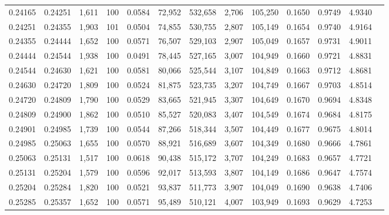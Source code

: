 \begin{tabular}{rrrrrrrrrrrrr}
0.24165 & 0.24251 & 1,611 & 100 &                                     0.0584 &  72,952 & 532,658 &   2,706 & 105,250 & 0.1650 & 0.9749 & 4.9340 \\
0.24251 & 0.24355 & 1,903 & 101 &                                     0.0504 &  74,855 & 530,755 &   2,807 & 105,149 & 0.1654 & 0.9740 & 4.9164 \\
0.24355 & 0.24444 & 1,652 & 100 &                                     0.0571 &  76,507 & 529,103 &   2,907 & 105,049 & 0.1657 & 0.9731 & 4.9011 \\
0.24444 & 0.24544 & 1,938 & 100 &                                     0.0491 &  78,445 & 527,165 &   3,007 & 104,949 & 0.1660 & 0.9721 & 4.8831 \\
0.24544 & 0.24630 & 1,621 & 100 &                                     0.0581 &  80,066 & 525,544 &   3,107 & 104,849 & 0.1663 & 0.9712 & 4.8681 \\
0.24630 & 0.24720 & 1,809 & 100 &                                     0.0524 &  81,875 & 523,735 &   3,207 & 104,749 & 0.1667 & 0.9703 & 4.8514 \\
0.24720 & 0.24809 & 1,790 & 100 &                                     0.0529 &  83,665 & 521,945 &   3,307 & 104,649 & 0.1670 & 0.9694 & 4.8348 \\
0.24809 & 0.24900 & 1,862 & 100 &                                     0.0510 &  85,527 & 520,083 &   3,407 & 104,549 & 0.1674 & 0.9684 & 4.8175 \\
0.24901 & 0.24985 & 1,739 & 100 &                                     0.0544 &  87,266 & 518,344 &   3,507 & 104,449 & 0.1677 & 0.9675 & 4.8014 \\
0.24985 & 0.25063 & 1,655 & 100 &                                     0.0570 &  88,921 & 516,689 &   3,607 & 104,349 & 0.1680 & 0.9666 & 4.7861 \\
0.25063 & 0.25131 & 1,517 & 100 &                                     0.0618 &  90,438 & 515,172 &   3,707 & 104,249 & 0.1683 & 0.9657 & 4.7721 \\
0.25131 & 0.25204 & 1,579 & 100 &                                     0.0596 &  92,017 & 513,593 &   3,807 & 104,149 & 0.1686 & 0.9647 & 4.7574 \\
0.25204 & 0.25284 & 1,820 & 100 &                                     0.0521 &  93,837 & 511,773 &   3,907 & 104,049 & 0.1690 & 0.9638 & 4.7406 \\
0.25285 & 0.25357 & 1,652 & 100 &                                     0.0571 &  95,489 & 510,121 &   4,007 & 103,949 & 0.1693 & 0.9629 & 4.7253 \\

\end{tabular}
